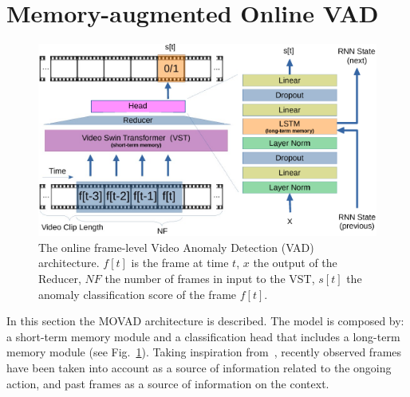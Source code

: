 \section{Memory-augmented Online VAD}
\label{sec:theory}

\fboxsep=1mm%
\fboxrule=1pt%

\begin{figure}[!t]
            \centerline{\includegraphics[clip, width=\linewidth]{images/arch-rx-cropped.pdf}}
        \caption{The online frame-level Video Anomaly Detection (VAD) architecture. $f[t]$ is the frame at time $t$, $x$ the output of the Reducer, $\mathit{NF}$ the number of frames in input to the VST, $s[t]$ the anomaly classification score of the frame $f[t]$.\label{fig:arch}}
\end{figure}

In this section the MOVAD architecture is described.  
The model is composed by: a short-term memory module and a classification head that includes a long-term  memory module (see Fig.~\ref{fig:arch}). 
Taking inspiration from~\cite{xu2021long}, recently observed frames have been taken into account as a source of information related to the ongoing action, and past frames as a source of information on the context.

